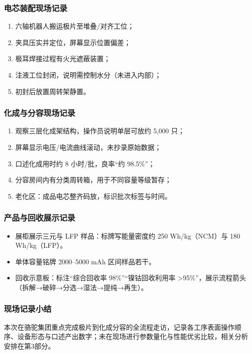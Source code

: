 \subsubsection{电芯装配现场记录}
\begin{enumerate}[label=\arabic*.]
  \item 六轴机器人搬运极片至堆叠/对齐工位；
  \item 夹具压实并定位，屏幕显示位置偏差；
  \item 极耳焊接过程有火光遮蔽装置；
  \item 注液工位封闭，说明需控制水分（未进入内部）；
  \item 初封后放置周转架静置。
\end{enumerate}

\subsubsection{化成与分容现场记录}
\begin{enumerate}[label=\arabic*.]
  \item 观察三层化成架结构，操作员说明单层可放约 5,000 只；
  \item 屏幕显示电压/电流曲线滚动，未抄录原始数据；
  \item 口述化成用时约 8 小时/批，良率“约 98.5\%”；
  \item 分容房间内有分类周转箱，用于不同容量等级暂存；
  \item 老化区：成品电芯整齐码放，标识批次标签与时间。
\end{enumerate}

\subsubsection{产品与回收展示记录}
\begin{itemize}
  \item 展柜展示三元与 LFP 样品：标牌写能量密度约 250 Wh/kg（NCM）与 180 Wh/kg（LFP）。
  \item 单体容量铭牌 2000–5000 mAh 区间样品若干。
  \item 回收示意板：标注“综合回收率 98\%”“镍钴回收利用率 >95\%”，展示流程箭头（拆解→破碎→分选→湿法→提纯→再生）。
\end{itemize}

\subsubsection{现场记录小结}
本次在骆驼集团重点完成极片到化成分容的全流程走访，记录各工序表面操作顺序、设备形态与口述产出数字；未在现场进行参数量化与性能优劣比较，相关分析安排在第3部分。

